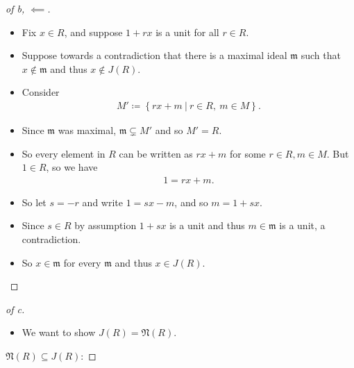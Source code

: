 \begin{solution}
\begin{proof}[of b, $\impliedby$]
\begin{itemize}
\item
  Fix \(x\in R\), and suppose \(1+rx\) is a unit for all \(r\in R\).
\item
  Suppose towards a contradiction that there is a maximal ideal
  \(\mathfrak{m}\) such that \(x\not \in \mathfrak{m}\) and thus
  \(x\not\in J(R)\).
\item
  Consider
  \begin{align*}
  M' \coloneqq\left\{{rx + m {~\mathrel{\Big|}~}r\in R,~ m\in M}\right\}
  .\end{align*}
\item
  Since \(\mathfrak{m}\) was maximal, \(\mathfrak{m} \subsetneq M'\) and
  so \(M' = R\).
\item
  So every element in \(R\) can be written as \(rx + m\) for some
  \(r\in R, m\in M\). But \(1\in R\), so we have
  \begin{align*}
  1 = rx + m
  .\end{align*}
\item
  So let \(s = -r\) and write \(1 = sx - m\), and so \(m = 1 + sx\).
\item
  Since \(s\in R\) by assumption \(1+sx\) is a unit and thus
  \(m \in \mathfrak{m}\) is a unit, a contradiction.
\item
  So \(x\in \mathfrak{m}\) for every \(\mathfrak{m}\) and thus
  \(x\in J(R)\).
\end{itemize}

\end{proof}

\begin{proof}[of c]

\begin{itemize}
\tightlist
\item
  We want to show \(J(R) = \mathfrak N(R)\).
\end{itemize}

\(\mathfrak N(R) \subseteq J(R)\):


\end{proof}
\end{solution}
